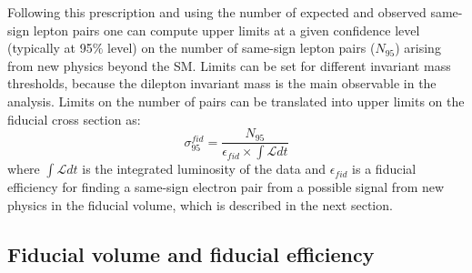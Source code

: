 Following this prescription and using the number of expected and observed same-sign lepton pairs one can compute 
upper limits at a given confidence level (typically at 95$\%$ level) on the number of same-sign lepton pairs ($N_{95}$)
arising from new physics beyond the SM. Limits can be set for different invariant mass thresholds, 
because the dilepton invariant mass is the main observable in the analysis.
Limits on the number of pairs can be translated into upper limits on the fiducial cross section as:
\begin{equation}
 \sigma_{95}^{fid} = \dfrac{N_{95}}{\epsilon_{fid} \times \int \mathscr{L} dt}
 \label{eq:fid_cross_section}
\end{equation}
where $\int \mathscr{L} dt$ is the integrated luminosity of the data and $\epsilon_{fid}$ is a fiducial efficiency for finding a same-sign electron pair from
a possible signal from new physics in the fiducial volume, which is described in the next section.


\subsection{Fiducial volume and fiducial efficiency}
\label{subsec:fid_volume_eff}

